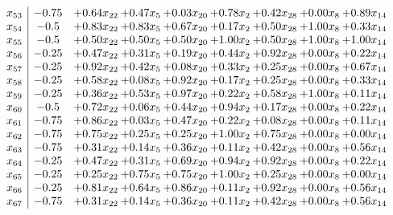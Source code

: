 \documentclass[8pt]{article}
\begin{document}
\[\begin{array}{c| c c@{\hskip 2pt} c@{\hskip 2pt} c@{\hskip 2pt} c@{\hskip 2pt} c@{\hskip 2pt} c@{\hskip 2pt} c@{\hskip 2pt} }
 x_{53}   &  -0.75 & +  0.64 x_{22} & +  0.47 x_{5} & +  0.03 x_{20} & +  0.78 x_{2} & +  0.42 x_{28} & +  0.00 x_{8} & +  0.89 x_{14}\\
 x_{54}   &  -0.5 & +  0.83 x_{22} & +  0.83 x_{5} & +  0.67 x_{20} & +  0.17 x_{2} & +  0.50 x_{28} & +  1.00 x_{8} & +  0.33 x_{14}\\
 x_{55}   &  -0.5 & +  0.50 x_{22} & +  0.50 x_{5} & +  0.50 x_{20} & +  1.00 x_{2} & +  0.50 x_{28} & +  1.00 x_{8} & +  1.00 x_{14}\\
 x_{56}   &  -0.25 & +  0.47 x_{22} & +  0.31 x_{5} & +  0.19 x_{20} & +  0.44 x_{2} & +  0.92 x_{28} & +  0.00 x_{8} & +  0.22 x_{14}\\
 x_{57}   &  -0.25 & +  0.92 x_{22} & +  0.42 x_{5} & +  0.08 x_{20} & +  0.33 x_{2} & +  0.25 x_{28} & +  0.00 x_{8} & +  0.67 x_{14}\\
 x_{58}   &  -0.25 & +  0.58 x_{22} & +  0.08 x_{5} & +  0.92 x_{20} & +  0.17 x_{2} & +  0.25 x_{28} & +  0.00 x_{8} & +  0.33 x_{14}\\
 x_{59}   &  -0.25 & +  0.36 x_{22} & +  0.53 x_{5} & +  0.97 x_{20} & +  0.22 x_{2} & +  0.58 x_{28} & +  1.00 x_{8} & +  0.11 x_{14}\\
 x_{60}   &  -0.5 & +  0.72 x_{22} & +  0.06 x_{5} & +  0.44 x_{20} & +  0.94 x_{2} & +  0.17 x_{28} & +  0.00 x_{8} & +  0.22 x_{14}\\
 x_{61}   &  -0.75 & +  0.86 x_{22} & +  0.03 x_{5} & +  0.47 x_{20} & +  0.22 x_{2} & +  0.08 x_{28} & +  0.00 x_{8} & +  0.11 x_{14}\\
 x_{62}   &  -0.75 & +  0.75 x_{22} & +  0.25 x_{5} & +  0.25 x_{20} & +  1.00 x_{2} & +  0.75 x_{28} & +  0.00 x_{8} & +  0.00 x_{14}\\
 x_{63}   &  -0.75 & +  0.31 x_{22} & +  0.14 x_{5} & +  0.36 x_{20} & +  0.11 x_{2} & +  0.42 x_{28} & +  0.00 x_{8} & +  0.56 x_{14}\\
 x_{64}   &  -0.25 & +  0.47 x_{22} & +  0.31 x_{5} & +  0.69 x_{20} & +  0.94 x_{2} & +  0.92 x_{28} & +  0.00 x_{8} & +  0.22 x_{14}\\
 x_{65}   &  -0.25 & +  0.25 x_{22} & +  0.75 x_{5} & +  0.75 x_{20} & +  1.00 x_{2} & +  0.25 x_{28} & +  0.00 x_{8} & +  0.00 x_{14}\\
 x_{66}   &  -0.25 & +  0.81 x_{22} & +  0.64 x_{5} & +  0.86 x_{20} & +  0.11 x_{2} & +  0.92 x_{28} & +  0.00 x_{8} & +  0.56 x_{14}\\
 x_{67}   &  -0.75 & +  0.31 x_{22} & +  0.14 x_{5} & +  0.36 x_{20} & +  0.11 x_{2} & +  0.42 x_{28} & +  0.00 x_{8} & +  0.56 x_{14}\\

\end{array}\]
\end{document}

